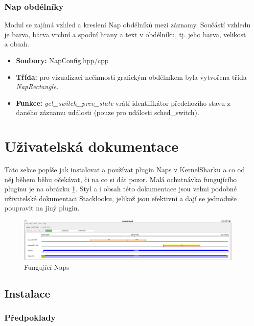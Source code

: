 \subsubsection*{Nap obdélníky}
Modul se zajímá vzhled a kreslení Nap obdélníků mezi záznamy. Součástí vzhledu je barva, barva vrchní a spodní hrany a text v obdélníku, tj. jeho barva, velikost a obsah.

\begin{itemize}
    \item \textbf{Soubory:} NapConfig.hpp/cpp
    \item \textbf{Třída:} pro vizualizaci nečinnosti grafickým obdélníkem byla vytvořena třída \emph{NapRectangle}.
    \item \textbf{Funkce:} \emph{get\_switch\_prev\_state} vrátí identifikátor předchozího stavu z daného záznamu události (pouze pro události sched\_switch).
\end{itemize}

\section{Uživatelská dokumentace}

Tato sekce popíše jak instalovat a používat plugin Naps v KernelSharku a co od něj během běhu očekávat, či na co si dát pozor. Malá ochutnávka fungujícího pluginu je na obrázku \ref{naps-workin}. Styl a i obsah této dokumentace jsou velmi podobné uživatelské dokumentaci Stacklooku, jelikož jsou efektivní a dají se jednoduše poupravit na jiný plugin.

\begin{figure}[p]\centering
    \includegraphics[width=140mm]{img/Naps/NapsWorking}
    \caption{Fungující Naps}
    \label{naps-workin}
\end{figure}

\subsection{Instalace}

\subsubsection{Předpoklady}

